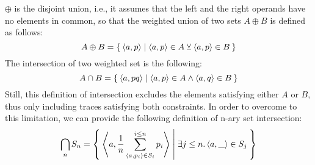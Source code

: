 $\oplus$ is the disjoint union, i.e., it assumes that the left and the right operands have no elements in common, so that the weighted union of two sets $A\oplus B$ is defined as follows:
\[A\oplus B=\Set{\braket{a,p}|\braket{a,p}\in A\veebar \braket{a,p}\in B}\]
The intersection of two weighted set is the following:
\[A\cap B=\Set{\braket{a,pq}|\braket{a,p}\in A \wedge \braket{a,q}\in B}\]
Still, this definition of intersection excludes the elements satisfying either $A$ or $B$, thus only including traces satisfying both constraints. In order to overcome to this limitation, we can provide the following definition of n-ary set intersection:
\[\bigcap_n S_n = \Set{\Braket{a,\frac{1}{n}\sum_{\braket{a,p_i}\in S_i}^{i\leq n}p_i}|\exists j\leq n. \braket{a,\_}\in S_j}\]




